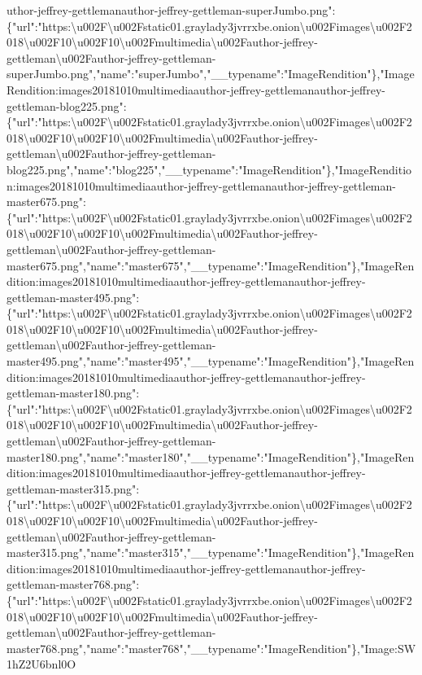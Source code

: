 uthor-jeffrey-gettlemanauthor-jeffrey-gettleman-superJumbo.png":\{"url":"https:\textbackslash{}u002F\textbackslash{}u002Fstatic01.graylady3jvrrxbe.onion\textbackslash{}u002Fimages\textbackslash{}u002F2018\textbackslash{}u002F10\textbackslash{}u002F10\textbackslash{}u002Fmultimedia\textbackslash{}u002Fauthor-jeffrey-gettleman\textbackslash{}u002Fauthor-jeffrey-gettleman-superJumbo.png","name":"superJumbo","\_\_typename":"ImageRendition"\},"ImageRendition:images20181010multimediaauthor-jeffrey-gettlemanauthor-jeffrey-gettleman-blog225.png":\{"url":"https:\textbackslash{}u002F\textbackslash{}u002Fstatic01.graylady3jvrrxbe.onion\textbackslash{}u002Fimages\textbackslash{}u002F2018\textbackslash{}u002F10\textbackslash{}u002F10\textbackslash{}u002Fmultimedia\textbackslash{}u002Fauthor-jeffrey-gettleman\textbackslash{}u002Fauthor-jeffrey-gettleman-blog225.png","name":"blog225","\_\_typename":"ImageRendition"\},"ImageRendition:images20181010multimediaauthor-jeffrey-gettlemanauthor-jeffrey-gettleman-master675.png":\{"url":"https:\textbackslash{}u002F\textbackslash{}u002Fstatic01.graylady3jvrrxbe.onion\textbackslash{}u002Fimages\textbackslash{}u002F2018\textbackslash{}u002F10\textbackslash{}u002F10\textbackslash{}u002Fmultimedia\textbackslash{}u002Fauthor-jeffrey-gettleman\textbackslash{}u002Fauthor-jeffrey-gettleman-master675.png","name":"master675","\_\_typename":"ImageRendition"\},"ImageRendition:images20181010multimediaauthor-jeffrey-gettlemanauthor-jeffrey-gettleman-master495.png":\{"url":"https:\textbackslash{}u002F\textbackslash{}u002Fstatic01.graylady3jvrrxbe.onion\textbackslash{}u002Fimages\textbackslash{}u002F2018\textbackslash{}u002F10\textbackslash{}u002F10\textbackslash{}u002Fmultimedia\textbackslash{}u002Fauthor-jeffrey-gettleman\textbackslash{}u002Fauthor-jeffrey-gettleman-master495.png","name":"master495","\_\_typename":"ImageRendition"\},"ImageRendition:images20181010multimediaauthor-jeffrey-gettlemanauthor-jeffrey-gettleman-master180.png":\{"url":"https:\textbackslash{}u002F\textbackslash{}u002Fstatic01.graylady3jvrrxbe.onion\textbackslash{}u002Fimages\textbackslash{}u002F2018\textbackslash{}u002F10\textbackslash{}u002F10\textbackslash{}u002Fmultimedia\textbackslash{}u002Fauthor-jeffrey-gettleman\textbackslash{}u002Fauthor-jeffrey-gettleman-master180.png","name":"master180","\_\_typename":"ImageRendition"\},"ImageRendition:images20181010multimediaauthor-jeffrey-gettlemanauthor-jeffrey-gettleman-master315.png":\{"url":"https:\textbackslash{}u002F\textbackslash{}u002Fstatic01.graylady3jvrrxbe.onion\textbackslash{}u002Fimages\textbackslash{}u002F2018\textbackslash{}u002F10\textbackslash{}u002F10\textbackslash{}u002Fmultimedia\textbackslash{}u002Fauthor-jeffrey-gettleman\textbackslash{}u002Fauthor-jeffrey-gettleman-master315.png","name":"master315","\_\_typename":"ImageRendition"\},"ImageRendition:images20181010multimediaauthor-jeffrey-gettlemanauthor-jeffrey-gettleman-master768.png":\{"url":"https:\textbackslash{}u002F\textbackslash{}u002Fstatic01.graylady3jvrrxbe.onion\textbackslash{}u002Fimages\textbackslash{}u002F2018\textbackslash{}u002F10\textbackslash{}u002F10\textbackslash{}u002Fmultimedia\textbackslash{}u002Fauthor-jeffrey-gettleman\textbackslash{}u002Fauthor-jeffrey-gettleman-master768.png","name":"master768","\_\_typename":"ImageRendition"\},"Image:SW1hZ2U6bnl0O
